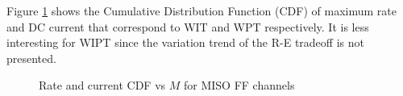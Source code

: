 Figure \ref{fig:miso-cdf} shows the Cumulative Distribution Function (CDF) of maximum rate and DC current that correspond to WIT and WPT respectively. It is less interesting for WIPT since the variation trend of the R-E tradeoff is not presented.

\begin{figure}[ht]
  \centering
  \caption{Rate and current CDF vs $M$ for MISO FF channels}
  \label{fig:miso-cdf}
\end{figure} 